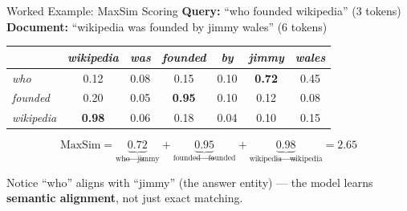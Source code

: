 \documentclass[aspectratio=169]{beamer}
\newif\ifanimated
\newcommand{\cpause}{\ifanimated\pause\fi}
\begin{document}
\begin{frame}[shrink=10]{Worked Example: MaxSim Scoring}
\textbf{Query:} ``who founded wikipedia'' (3 tokens)\\
\textbf{Document:} ``wikipedia was founded by jimmy wales'' (6 tokens)

\vspace{0.5em}

\begin{table}
\centering
\footnotesize
\begin{tabular}{lcccccc}
\toprule
& \textit{wikipedia} & \textit{was} & \textit{founded} & \textit{by} & \textit{jimmy} & \textit{wales} \\
\midrule
\textit{who}       & 0.12 & 0.08 & 0.15 & 0.10 & \textbf{0.72} & 0.45 \\
\textit{founded}   & 0.20 & 0.05 & \textbf{0.95} & 0.10 & 0.12 & 0.08 \\
\textit{wikipedia} & \textbf{0.98} & 0.06 & 0.18 & 0.04 & 0.10 & 0.15 \\
\bottomrule
\end{tabular}
\end{table}

\cpause
\vspace{0.5em}

$$\text{MaxSim} = \underbrace{0.72}_{\text{who}\to\text{jimmy}} + \underbrace{0.95}_{\text{founded}\to\text{founded}} + \underbrace{0.98}_{\text{wikipedia}\to\text{wikipedia}} = \mathbf{2.65}$$

\vspace{0.5em}

\begin{exampleblock}{Notice}
``who'' aligns with ``jimmy'' (the answer entity) --- the model learns \textbf{semantic alignment}, not just exact matching.
\end{exampleblock}
\end{frame}
\end{document}
